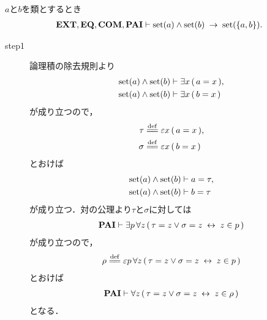 	\begin{screen}
		\begin{thm}[集合の対は集合である]
		\label{thm:pair_of_sets_is_a_set}
			$a$と$b$を類とするとき
			\begin{align}
				\mbox{{\bf EXT}},\mbox{{\bf EQ}},\mbox{\bf COM},\mbox{{\bf PAI}} \vdash 
				\operatorname*{set} (a) \wedge \operatorname*{set} (b) \hspace{0.25em}\rightarrow\hspace{0.25em} \operatorname*{set} (\{a,b\}).
			\end{align}
		\end{thm}
	\end{screen}
	
	\begin{sketch}\mbox{}
		\begin{description}
			\item[step1]
				論理積の除去規則より
				\begin{align}
					\operatorname*{set} (a) \wedge \operatorname*{set} (b) &\vdash \exists x\, (\, a = x\, ), \\
					\operatorname*{set} (a) \wedge \operatorname*{set} (b) &\vdash \exists x\, (\, b = x\, )
				\end{align}
				が成り立つので，
				\begin{align}
					\tau &\defeq \varepsilon x\, (\, a = x\, ), \\
					\sigma &\defeq \varepsilon x\, (\, b = x\, )
				\end{align}
				とおけば
				\begin{align}
					\operatorname*{set} (a) \wedge \operatorname*{set} (b) &\vdash a = \tau, 
					\label{fom:pair_of_sets_is_a_set_1} \\
					\operatorname*{set} (a) \wedge \operatorname*{set} (b) &\vdash b = \tau
				\end{align}
				が成り立つ．対の公理より$\tau$と$\sigma$に対しては
				\begin{align}
					\mbox{{\bf PAI}} \vdash \exists p\, \forall z\, 
						(\, \tau = z \vee \sigma = z \hspace{0.25em}\leftrightarrow\hspace{0.25em} z \in p\, )
				\end{align}
				が成り立つので，
				\begin{align}
					\rho \defeq \varepsilon p\, \forall z\, 
						(\, \tau = z \vee \sigma = z \lrarrow z \in p\, )
				\end{align}
				とおけば
				\begin{align}
					\mbox{{\bf PAI}} \vdash \forall z\, (\, \tau = z \vee \sigma = z \hspace{0.25em}\leftrightarrow\hspace{0.25em} z \in \rho\, )
					\label{fom:pair_of_sets_is_a_set_2}
				\end{align}
				となる．
				

\end{description}
\end{sketch}
